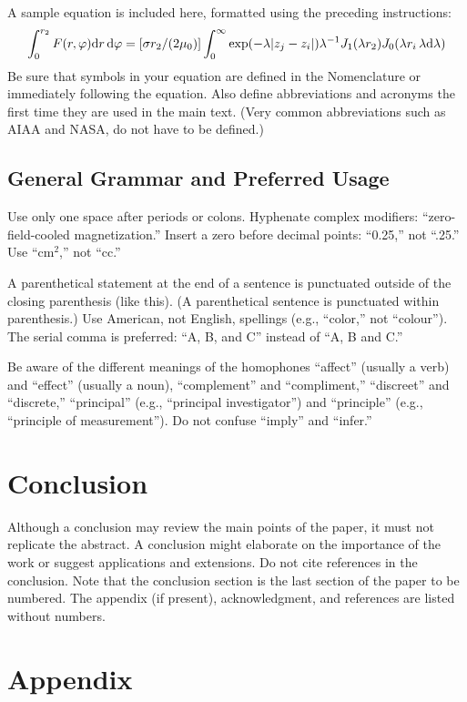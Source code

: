 \documentclass{AIAA}
\begin{document}
A sample equation is included here, formatted using the preceding instructions:
\begin{equation}
\int^{r_2}_0 F(r,\varphi){\rm d}r\,{\rm d}\varphi = [\sigma r_2/(2\mu_0)]\int^{\infty}_0\exp(-\lambda|z_j-z_i|)\lambda^{-1}J_1 (\lambda r_2)J_0 (\lambda r_i\,\lambda {\rm d}\lambda) 
\end{equation}
Be sure that symbols in your equation are defined in the Nomenclature or immediately following the equation. Also define abbreviations and acronyms the first time they are used in the main text. (Very common abbreviations such as AIAA and NASA, do not have to be defined.)

\subsection{General Grammar and Preferred Usage}
Use only one space after periods or colons. Hyphenate complex modifiers: ``zero-field-cooled magnetization.'' Insert a zero before decimal points: ``0.25,'' not ``.25.'' Use ``cm$^{2}$,'' not ``cc.''

A parenthetical statement at the end of a sentence is punctuated outside of the closing parenthesis (like this). (A parenthetical sentence is punctuated within parenthesis.) Use American, not English, spellings (e.g., ``color,'' not ``colour''). The serial comma is preferred: ``A, B, and C'' instead of ``A, B and C.''

Be aware of the different meanings of the homophones ``affect'' (usually a verb) and ``effect'' (usually a noun), ``complement'' and ``compliment,'' ``discreet'' and ``discrete,'' ``principal'' (e.g., ``principal investigator'') and ``principle'' (e.g., ``principle of measurement''). Do not confuse ``imply'' and ``infer.''

\section{Conclusion}
Although a conclusion may review the main points of the paper, it must not replicate the abstract. A conclusion might elaborate on the importance of the work or suggest applications and extensions. Do not cite references in the conclusion. Note that the conclusion section is the last section of the paper to be numbered. The appendix (if present), acknowledgment, and references are listed without numbers.

\section*{Appendix}
\end{document}
